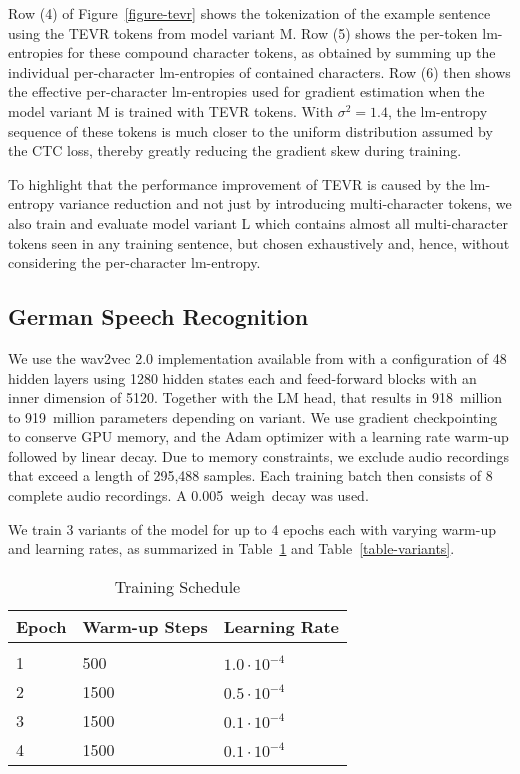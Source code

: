Row (4) of Figure~\ref{figure-tevr} shows the tokenization of the example sentence using the TEVR tokens from model variant M. 
Row (5) shows the per-token lm-entropies for these compound character tokens, as obtained by summing up the individual per-character lm-entropies of contained characters. 
Row (6) then shows the effective per-character lm-entropies used for gradient estimation when the model variant M is trained with TEVR tokens. With $\sigma^2=1.4$, the lm-entropy sequence of these tokens is much closer to the uniform distribution assumed by the CTC loss, thereby greatly reducing the gradient skew during training.

To highlight that the performance improvement of TEVR is caused by the lm-entropy variance reduction and not just by introducing multi-character tokens, we also train and evaluate model variant L which contains almost all multi-character tokens seen in any training sentence, but chosen exhaustively and, hence, without considering the per-character lm-entropy.

\subsection{German Speech Recognition}

We use the wav2vec 2.0 implementation available from \citet{huggingface}
with a configuration of 48 hidden layers using 1280 hidden states each
and feed-forward blocks with an inner dimension of 5120.
Together with the LM head, that results in 918~million to 919~million parameters 
depending on variant.
We use gradient checkpointing \citep{checkpointing} to conserve GPU memory,
and the Adam optimizer \citep{adam} with a learning rate warm-up followed by linear decay. Due to memory constraints, we exclude audio recordings that exceed a length of 295,488 samples. Each training batch then consists of 8 complete audio recordings. A 0.005~weigh~decay was used.

We train 3 variants of the model for up to 4 epochs each with varying warm-up and learning rates, as summarized in Table~\ref{table-train} and Table~\ref{table-variants}.
\\

\begin{table}[h]
\begin{center}
\begin{tabular}{lll}
Epoch & Warm-up Steps & Learning Rate \\
\hline \\
1 & 500 & $1.0 \cdot 10^{-4}$ \\
2 & 1500 & $0.5 \cdot 10^{-4}$ \\
3 & 1500 & $0.1 \cdot 10^{-4}$ \\
4 & 1500 & $0.1 \cdot 10^{-4}$ \\
\end{tabular}
\end{center}
\caption{Training Schedule}
\label{table-train}
\end{table}

